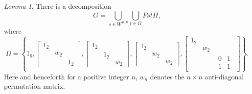 \documentclass[12pt]{amsart}
\theoremstyle{Theorem}
\theoremstyle{Theorem}
\theoremstyle{Theorem}
\theoremstyle{Theorem}
\theoremstyle{Plain}
\theoremstyle{remark}
\theoremstyle{remark}
\theoremstyle{Definition}
\newtheorem{lemd}[dfn]{Lemma}
\begin{document}
\begin{lemd}
    \label{orbit2}
    There is a decomposition
    \[
        G = \bigcup_{ s \in W^{P, P} } \bigcup_{ t \in \Omega } PstH,
    \]
    where
    \[
        \Omega = \left\{ 1_6,
        \begin{bmatrix}
            1_2 &   &   \\
                &w_2&   \\
                &   &1_2
        \end{bmatrix}
        ,
        \begin{bmatrix}
            1_2 &     &    \\
                & 1_2 &    \\
                &     & w_2
        \end{bmatrix}
        ,
        \begin{bmatrix}
            1_2 &     &    \\
                & w_2 &    \\
                &     & w_2
        \end{bmatrix}
        ,
        \begin{bmatrix}
            1_2 &     &       \\
                & w_2 &       \\
                &     &
                \begin{matrix}
                    0 & 1\\
                    1 & 1
                \end{matrix}
        \end{bmatrix}
        \right\}.
    \]
    Here and henceforth for a positive integer $n$, $w_n$ denotes the $n\times n$ anti-diagonal permutation matrix. 
\end{lemd}
    
\end{document}
